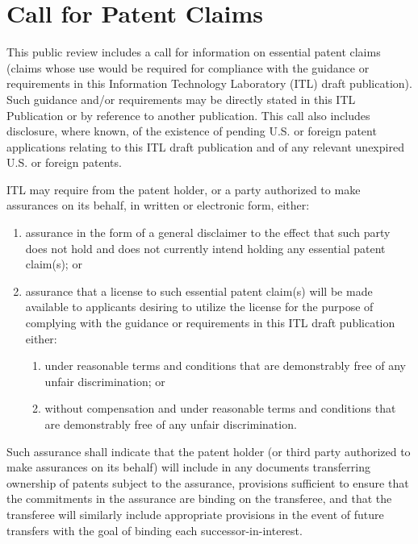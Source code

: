 \clearpage


\section*{Call for Patent Claims}
This public review includes a call for information on essential patent claims (claims whose use would be required for compliance with the guidance or requirements in this Information Technology Laboratory (ITL) draft publication). Such guidance and/or requirements may be directly stated in this ITL Publication or by reference to another publication. This call also includes disclosure, where known, of the existence of pending U.S. or foreign patent applications relating to this ITL draft publication and of any relevant unexpired U.S. or foreign patents.

ITL may require from the patent holder, or a party authorized to make assurances on its behalf, in written or electronic form, either:

\begin{enumerate}[label=\alph*)]

\item assurance in the form of a general disclaimer to the effect that such party does not hold and does not currently intend holding any essential patent claim(s); or

\item assurance that a license to such essential patent claim(s) will be made available to applicants desiring to utilize the license for the purpose of complying with the guidance or requirements in this ITL draft publication either:

    \begin{enumerate}[label=\roman*.]

    \item under reasonable terms and conditions that are demonstrably free of any unfair discrimination; or

    \item without compensation and under reasonable terms and conditions that are demonstrably free of any unfair discrimination.

    \end{enumerate}

\end{enumerate}

Such assurance shall indicate that the patent holder (or third party authorized to make assurances on its behalf) will include in any documents transferring ownership of patents subject to the assurance, provisions sufficient to ensure that the commitments in the assurance are binding on the transferee, and that the transferee will similarly include appropriate provisions in the event of future transfers with the goal of binding each successor-in-interest.

